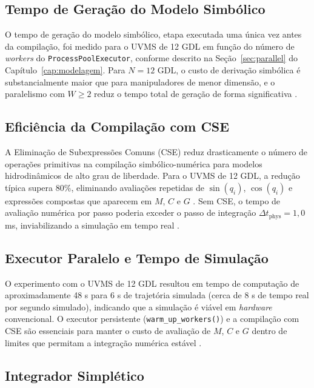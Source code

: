\subsection{Tempo de Geração do Modelo Simbólico}

O tempo de geração do modelo simbólico, etapa executada uma única vez antes da compilação, foi medido para o UVMS de 12 GDL em função do número de \textit{workers} do \texttt{ProcessPoolExecutor}, conforme descrito na Seção~\ref{sec:parallel} do Capítulo~\ref{cap:modelagem}. Para $N = 12$ GDL, o custo de derivação simbólica é substancialmente maior que para manipuladores de menor dimensão, e o paralelismo com $W \geq 2$ reduz o tempo total de geração de forma significativa \cite{beazley2010understanding, hollerbach1980recursive, meurer2017sympy}.

\subsection{Eficiência da Compilação com CSE}

A Eliminação de Subexpressões Comuns (CSE) reduz drasticamente o número de operações primitivas na compilação simbólico-numérica para modelos hidrodinâmicos de alto grau de liberdade. Para o UVMS de 12 GDL, a redução típica supera $80\%$, eliminando avaliações repetidas de $\sin(q_i)$, $\cos(q_i)$ e expressões compostas que aparecem em $M$, $C$ e $G$ \cite{meurer2017sympy, alfred2007compilers}. Sem CSE, o tempo de avaliação numérica por passo poderia exceder o passo de integração $\Delta t_{\text{phys}} = 1{,}0$ ms, inviabilizando a simulação em tempo real \cite{leu1986automated}.

\subsection{Executor Paralelo e Tempo de Simulação}

O experimento com o UVMS de 12 GDL resultou em tempo de computação de aproximadamente 48 s para 6 s de trajetória simulada (cerca de 8 s de tempo real por segundo simulado), indicando que a simulação é viável em \textit{hardware} convencional. O executor persistente (\texttt{warm\_up\_workers()}) e a compilação com CSE são essenciais para manter o custo de avaliação de $M$, $C$ e $G$ dentro de limites que permitam a integração numérica estável \cite{beazley2010understanding, leu1986automated}.

\subsection{Integrador Simplético}

